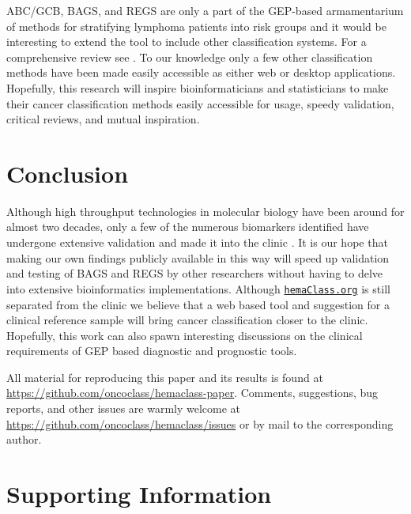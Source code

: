 \documentclass[10pt,letterpaper]{article}
\newcommand{\hemaClass}{\href{http://hemaClass.org}{\texttt{hemaClass.org}}}
\begin{document}
ABC/GCB, BAGS, and REGS are only a part of the GEP-based armamentarium of methods for stratifying lymphoma patients into risk groups \cite{Shipp2002, Lossos2004a, Malumbres2008} and it would be interesting to extend the tool to include other classification systems.
For a comprehensive review see \cite{Coutinho2013}.
To our knowledge only a few other classification methods have been made easily accessible as either web or desktop applications.
Hopefully, this research will inspire bioinformaticians and statisticians to make their cancer classification methods easily accessible for usage, speedy validation, critical reviews, and mutual inspiration.

\section*{Conclusion}
Although high throughput technologies in molecular biology have been around for almost two decades, only a few of the numerous biomarkers identified have undergone extensive validation and made it into the clinic \cite{Chen2012a}.
It is our hope that making our own findings publicly available in this way will speed up validation and testing of BAGS and REGS by other researchers without having to delve into extensive bioinformatics implementations.
Although \hemaClass{} is still separated from the clinic we believe that a web based tool and suggestion for a clinical reference sample will bring cancer classification closer to the clinic.
Hopefully, this work can also spawn interesting discussions on the clinical requirements of GEP based diagnostic and prognostic tools.

All material for reproducing this paper and its results is found at \url{https://github.com/oncoclass/hemaclass-paper}.
Comments, suggestions, bug reports, and other issues are warmly welcome at \url{https://github.com/oncoclass/hemaclass/issues} or by mail to the corresponding author.

\section*{Supporting Information}

\setcounter{equation}{0}
\setcounter{figure}{0}
\setcounter{table}{0}

\renewcommand{\theequation}{S\arabic{equation}}
\renewcommand{\thefigure}{S\arabic{figure}}
\renewcommand{\thetable}{S\arabic{table}}
\renewcommand{\thesection}{S\arabic{section}}
\end{document}
